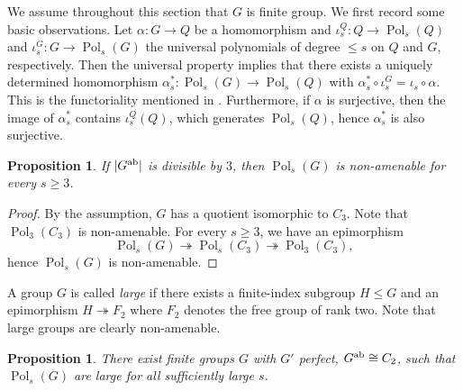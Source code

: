 \documentclass[a4paper,12pt]{amsart}
\theoremstyle{plain}
\newtheorem{proposition}[subsection]{{\bf Proposition}}
\theoremstyle{definition}
\theoremstyle{remark}
\numberwithin{equation}{subsection}
\DeclareMathOperator{\Pold}{Pol}
\begin{document}
\noindent
We assume throughout this section that $G$ is finite group. We first record some basic observations. Let $\alpha:G\to Q$ be a homomorphism and  $\iota_s^Q:Q\to\Pold_s(Q)$  and $\iota_s^G:G\to\Pold_s(G)$ the universal polynomials of degree $\le s$ on $Q$ and $G$, respectively. Then the universal property implies that there exists a uniquely determined homomorphism $\alpha_s^*:\Pold_s(G)\to\Pold_s(Q)$ with $\alpha_s^*\circ \iota_s^G=\iota_s\circ \alpha$. This is the functoriality mentioned in \cite{JT24}. Furthermore, if $\alpha$ is surjective, then the image of $\alpha_s^*$ contains $\iota_s^Q(Q)$, which generates $\Pold_s(Q)$, hence $\alpha_s^*$ is also surjective.

\begin{proposition}
    \label{prop:Gabdivisibleby3}
    If $|G^{\rm ab}|$ is divisible by $3$, then $\Pold_s(G)$ is non-amenable for every $s\ge 3$.
\end{proposition}

\begin{proof}
    By the assumption, $G$ has a quotient isomorphic to $C_3$. Note that $\Pold_3(C_3)$ is non-amenable. For every $s\ge 3$, we have an epimorphism
    $$\Pold_s(G)\twoheadrightarrow \Pold_s(C_3)\twoheadrightarrow \Pold_3(C_3),$$
    hence $\Pold_s(G)$ is non-amenable.
\end{proof}

A group $G$ is called \emph{large} if there exists a finite-index
subgroup $H\leq G$ and an epimorphism
$H\twoheadrightarrow F_2$
where $F_2$ denotes the free group of rank two. Note that large groups are clearly non-amenable.

\begin{proposition}
    \label{prop:c2perfect}
    There exist finite groups $G$ with $G'$ perfect, $G^{\rm ab}\cong C_2$, such that $\Pold_s(G)$ are large for all sufficiently large $s$.
\end{proposition}
\end{document}
